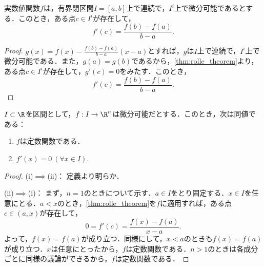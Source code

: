 \documentclass[a4paper,10pt]{ltjsarticle}
\begin{document}
\begin{MyTheorem}
  実数値関数\(f\)は，有界閉区間\(I=[a, b]\)上で連続で，\(I^i\)上で微分可能であるとする．このとき，ある点\(c \in I^i\)が存在して，
  \[ f'(c) = \frac{f(b) - f(a)}{b - a}. \]
\end{MyTheorem}
\begin{proof}
  \(g(x) = f(x) - \frac{f(b) - f(a)}{b - a}(x - a)\)とすれば，\(g\)は\(I\)上で連続で，\(I^i\)上で微分可能である．また，\(g(a) = g(b)\)であるから，\cref{thm:rolle_theorem}より，ある点\(c \in I^i\)が存在して，\(g'(c) = 0\)をみたす．このとき，
  \[ f'(c) = \frac{f(b) - f(a)}{b - a}. \]
\end{proof}

\begin{MyTheorem}
  \(I \subset \R\)を区間として，\(f: I \to \R^n\)は微分可能だとする．このとき，次は同値である：
  \begin{enumerate}
    \item \(f\)は定数関数である．
    \item \(f'(x) = 0 \ (\forall x \in I).\)
  \end{enumerate}
\end{MyTheorem}
\begin{proof}
  (i)\(\implies\)(ii)： 定義より明らか．

  (ii)\(\implies\)(i)： まず，\(n = 1\)のときについて示す．\(a\in I\)をとり固定する．\(x \in I\)を任意にとる．\(a < x\)のとき，\cref{thm:rolle_theorem}を\(f\)に適用すれば，ある点\(c \in (a, x)\)が存在して，
  \[ 0 = f'(c) = \frac{f(x) - f(a)}{x - a}. \]
  よって，\(f(x) = f(a)\)が成り立つ．同様にして，\(x < a\)のときも\(f(x) = f(a)\)が成り立つ．\(x\)は任意にとったから，\(f\)は定数関数である．\(n > 1\)のときは各成分ごとに同様の議論ができるから，\(f\)は定数関数である．
\end{proof}
\end{document}
